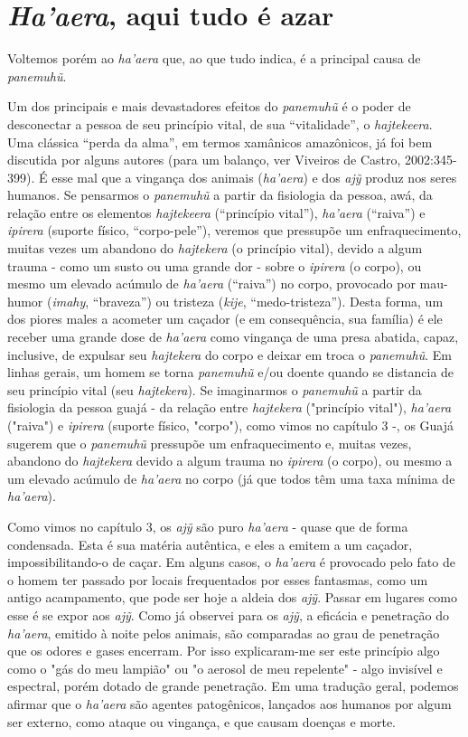 \section{\emph{Ha'aera}, aqui tudo é azar}

Voltemos porém ao \emph{ha'aera} que, ao que tudo indica, é a principal
causa de \emph{panemuhũ}.

Um dos principais e mais devastadores efeitos do \emph{panemuhũ} é o
poder de desconectar a pessoa de seu princípio vital, de sua
``vitalidade'', o \emph{hajtekeera}. Uma clássica ``perda da alma'', em
termos xamânicos amazônicos, já foi bem discutida por alguns autores
(para um balanço, ver Viveiros de Castro, 2002:345-399). É esse mal que
a vingança dos animais (\emph{ha'aera}) e dos \emph{ajỹ} produz nos
seres humanos. Se pensarmos o \emph{panemuhũ} a partir da fisiologia da
pessoa, awá, da relação entre os elementos \emph{hajtekeera}
(``princípio vital''), \emph{ha'aera} (``raiva'') e \emph{ipirera}
(suporte físico, ``corpo-pele''), veremos que pressupõe um
enfraquecimento, muitas vezes um abandono do \emph{hajtekera} (o
princípio vital), devido a algum trauma - como um susto ou uma grande
dor - sobre o \emph{ipirera} (o corpo), ou mesmo um elevado acúmulo de
\emph{ha'aera} (``raiva'') no corpo, provocado por mau-humor
(\emph{imahy}, ``braveza'') ou tristeza (\emph{kije},
``medo-tristeza''). Desta forma, um dos piores males a acometer um
caçador (e em consequência, sua família) é ele receber uma grande dose
de \emph{ha'aera} como vingança de uma presa abatida, capaz, inclusive,
de expulsar seu \emph{hajtekera} do corpo e deixar em troca o
\emph{panemuhũ}. Em linhas gerais, um homem se torna \emph{panemuhũ}
e/ou doente quando se distancia de seu princípio vital (seu
\emph{hajtekera}). Se imaginarmos o \emph{panemuhũ} a partir da
fisiologia da pessoa guajá - da relação entre \emph{hajtekera}
("princípio vital"), \emph{ha'aera} ("raiva") e \emph{ipirera} (suporte
físico, "corpo"), como vimos no capítulo 3 -, os Guajá sugerem que o
\emph{panemuhũ} pressupõe um enfraquecimento e, muitas vezes, abandono
do \emph{hajtekera} devido a algum trauma no \emph{ipirera} (o corpo),
ou mesmo a um elevado acúmulo de \emph{ha'aera} no corpo (já que todos
têm uma taxa mínima de \emph{ha'aera}).

Como vimos no capítulo 3, os \emph{ajỹ} são puro \emph{ha'aera} - quase
que de forma condensada. Esta é sua matéria autêntica, e eles a emitem a
um caçador, impossibilitando-o de caçar. Em alguns casos, o
\emph{ha'aera} é provocado pelo fato de o homem ter passado por locais
frequentados por esses fantasmas, como um antigo acampamento, que pode
ser hoje a aldeia dos \emph{ajỹ}. Passar em lugares como esse é se expor
aos \emph{ajỹ}. Como já observei para os \emph{ajỹ}, a eficácia e
penetração do \emph{ha'aera}, emitido à noite pelos animais, são
comparadas ao grau de penetração que os odores e gases encerram. Por
isso explicaram-me ser este princípio algo como o "gás do meu lampião"
ou "o aerosol de meu repelente" - algo invisível e espectral, porém
dotado de grande penetração. Em uma tradução geral, podemos afirmar que
o \emph{ha'aera} são agentes patogênicos, lançados aos humanos por algum
ser externo, como ataque ou vingança, e que causam doenças e morte.

